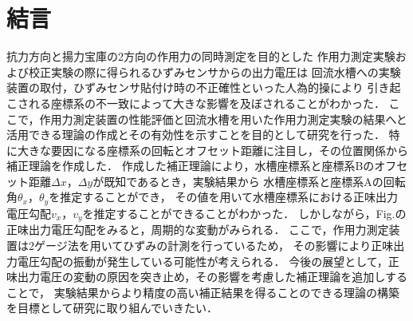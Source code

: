 \section{結言}
抗力方向と揚力宝庫の2方向の作用力の同時測定を目的とした
作用力測定実験および校正実験の際に得られるひずみセンサからの出力電圧は
回流水槽への実験装置の取付，ひずみセンサ貼付け時の不正確性といった人為的操により
引き起こされる座標系の不一致によって大きな影響を及ぼされることがわかった．
ここで，作用力測定装置の性能評価と回流水槽を用いた作用力測定実験の結果へと
活用できる理論の作成とその有効性を示すことを目的として研究を行った．
特に大きな要因になる座標系の回転とオフセット距離に注目し，その位置関係から補正理論を作成した．
作成した補正理論により，水槽座標系と座標系Bのオフセット距離$\Delta x$，$\Delta y$が既知であるとき，実験結果から
水槽座標系と座標系Aの回転角$\theta_x$，$\theta_y$を推定することができ，
その値を用いて水槽座標系における正味出力電圧勾配$v_x$，$v_y$を推定することができることがわかった．
しかしながら，Fig.の正味出力電圧勾配をみると，周期的な変動がみられる．
ここで，作用力測定装置は2ゲージ法を用いてひずみの計測を行っているため，
その影響により正味出力電圧勾配の振動が発生している可能性が考えられる．
今後の展望として，正味出力電圧の変動の原因を突き止め，その影響を考慮した補正理論を追加しすることで，
実験結果からより精度の高い補正結果を得ることのできる理論の構築を目標として研究に取り組んでいきたい．
